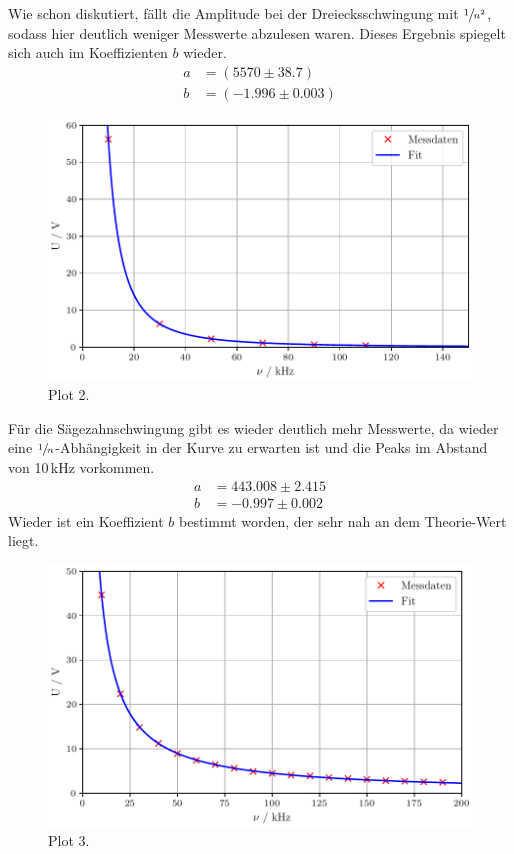 Wie schon diskutiert, fällt die Amplitude bei der Dreiecksschwingung mit $\sfrac{1}{n^2}$, sodass hier deutlich weniger Messwerte
abzulesen waren. Dieses Ergebnis spiegelt sich auch im Koeffizienten $b$ wieder.
\begin{align*}
  a &= (5570 ± 38.7)\\
  b &= (-1.996 ± 0.003)
\end{align*}
\begin{figure}[H]
  \centering
  \includegraphics[scale=0.6]{plotb.pdf}
  \caption{Plot 2.}
  \label{fig:Plot2}
\end{figure}\noindent
Für die Sägezahnschwingung gibt es wieder deutlich mehr Messwerte, da wieder eine $\sfrac{1}{n}$-Abhängigkeit in der Kurve zu erwarten
ist und die Peaks im Abstand von 10\,kHz vorkommen.
\begin{align*}
  a &= 443.008 ± 2.415\\
  b &= -0.997 ± 0.002
\end{align*} 
Wieder ist ein Koeffizient $b$ bestimmt worden, der sehr nah an dem Theorie-Wert liegt.
\begin{figure}[H]
  \centering
  \includegraphics[scale=0.6]{plotc.pdf} 
  \caption{Plot 3.}
  \label{fig:Plot3}
\end{figure} 